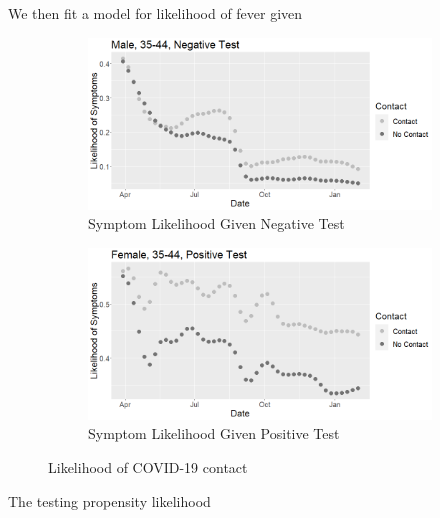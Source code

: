 \documentclass[11pt]{amsart}
\numberwithin{equation}{section}
\theoremstyle{plain}
\begin{document}
We then fit a model for likelihood of fever given

\begin{figure}[!th]
\centering
\begin{subfigure}{.5\textwidth}
 \centering
 \includegraphics[width=.9\linewidth]{../figs/tvprop_symptom_fig1.png}
 \caption{Symptom Likelihood Given Negative Test}
 \label{fig:symptomlik1}
\end{subfigure}%
\begin{subfigure}{.5\textwidth}
 \centering
\includegraphics[width=.9\linewidth]{../figs/tvprop_symptom_fig2.png}
 \caption{Symptom Likelihood Given Positive Test}
 \label{fig:symptomlik2}
\end{subfigure}
\caption{Likelihood of COVID-19 contact}
\label{fig:symptomlik}
\end{figure}

The testing propensity likelihood
\end{document}
